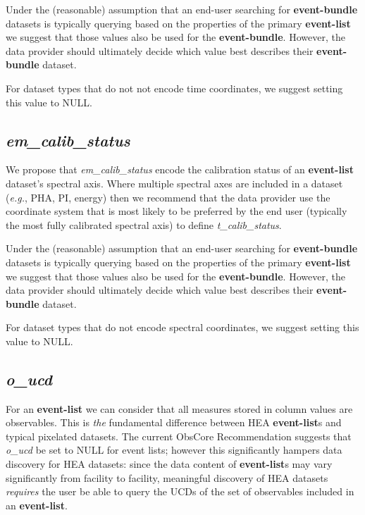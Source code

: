 \documentclass[11pt,a4paper]{ivoa}
\begin{document}
Under the (reasonable) assumption that an end-user searching for {\bf event-bundle} datasets is typically querying based on the properties of the primary {\bf event-list} we suggest that those values also be used for the {\bf event-bundle}.  However, the data provider should ultimately decide which value best describes their {\bf event-bundle} dataset.

For dataset types that do not not encode time coordinates, we suggest setting this value to NULL\null.

\subsection{{\em em\_calib\_status}}

We propose that {\em em\_calib\_status}  encode the calibration status of an {\bf event-list} dataset's spectral axis.  Where multiple spectral axes are included in a dataset ({\em e.g.\/}, PHA, PI, energy) then we recommend that the data provider use the coordinate system that is most likely to be preferred by the end user (typically the most fully calibrated spectral axis) to define {\em t\_calib\_status\/}.

Under the (reasonable) assumption that an end-user searching for {\bf event-bundle} datasets is typically querying based on the properties of the primary {\bf event-list} we suggest that those values also be used for the {\bf event-bundle}.  However, the data provider should ultimately decide which value best describes their {\bf event-bundle} dataset.

For dataset types that do not encode spectral coordinates, we suggest setting this value to NULL\null.

\subsection{{\em o\_ucd}}

For an {\bf event-list} we can consider that all measures stored in column values are observables.  This is {\em the\/} fundamental difference between HEA {\bf event-list}s and typical pixelated datasets.  The current ObsCore Recommendation suggests that {\em o\_ucd\/} be set to NULL for event lists; however this significantly hampers data discovery for HEA datasets: since the data content of {\bf event-list}s may vary significantly from facility to facility, meaningful discovery of HEA datasets {\em requires\/} the user be able to query the UCDs of the set of observables included in an {\bf event-list}.
\end{document}
